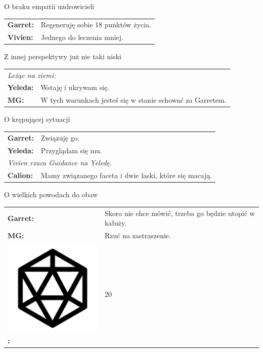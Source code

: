 \documentclass[10pt,twoside,twocolumn]{book}
\begin{document}
\begin{rpg-quotebox}{O braku empatii uzdrowicieli}
   \begin{tabularx}{\columnwidth}{lX}
      \textbf{Garret:} & Regeneruję sobie 18 punktów życia.\\
      \textbf{Vivien:} & Jednego do leczenia mniej.\\
   \end{tabularx}
\end{rpg-quotebox}

\begin{rpg-quotebox}{Z innej perspektywy już nie taki niski}
   \begin{tabularx}{\columnwidth}{lX}
      \multicolumn{2}{l}{\textit{Leżąc na ziemi:}}\\
      \textbf{Yeleda:} & Wstaję i ukrywam się.\\
      \textbf{MG:} & W tych warunkach jesteś się w stanie schować za Garretem.\\
   \end{tabularx}
\end{rpg-quotebox}

\begin{rpg-quotebox}{O krępującej sytuacji}
   \begin{tabularx}{\columnwidth}{lX}
      \textbf{Garret:} & Związuję go.\\
      \textbf{Yeleda:} & Przyglądam się mu.\\
      \multicolumn{2}{l}{\textit{Vivien rzuca Guidance na Yeledę.}}\\
      \textbf{Calion:} & Mamy związanego faceta i dwie laski, które się macają.\\
   \end{tabularx}
\end{rpg-quotebox}

\begin{rpg-quotebox}{O wielkich powodach do obaw}
   \begin{tabularx}{\columnwidth}{lX}
      \textbf{Garret:} & Skoro nie chce mówić, trzeba go będzie utopić w kałuży.\\
      \textbf{MG:} & Rzuć na zastraszenie.\\
      \includegraphics[scale=0.06]{img/d20.png}\textbf{:}& 20\\
   \end{tabularx}
\end{rpg-quotebox}
\end{document}
